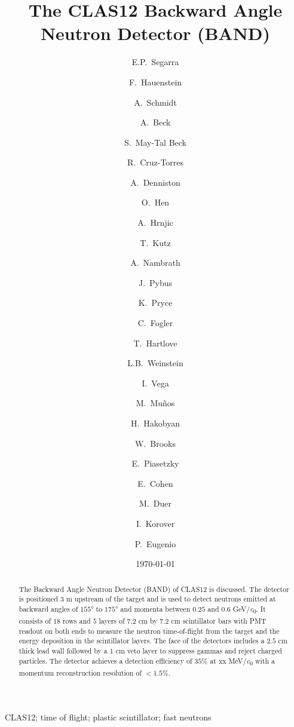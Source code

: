 \documentclass[3p,final,twocolumn]{elsarticle}
\newcommand*{\MIT }{Massachusetts Institute of Technology, Cambridge, Massachusetts 02139, USA}
\newcommand*{\ODU}{Old Dominion University, Norfolk, Virginia 23529, USA}
\newcommand*{\TAU }{School of Physics and Astronomy, Tel Aviv University, Tel Aviv 69978, Israel}
\newcommand*{\NRC}{Nuclear Research Center Negev, Be'er Sheva 84190, Israel}
\newcommand*{\FSU}{Florida State University, Tallahassee, Florida 32306, USA}
\newcommand*{\UTFSM}{Universidad T\'{e}cnica Federico Santa Mar\'{i}a, Casilla 110-V Valpara\'{i}so, Chile}
\begin{document}
\begin{frontmatter}

\title{The CLAS12 Backward Angle Neutron Detector (BAND) }



\author{E.P.~Segarra}
\author{F.~Hauenstein}

\author{A.~Schmidt}
\author{A.~Beck}
\author{S.~May-Tal Beck}
\author{R.~Cruz-Torres}
\author{A.~Denniston}
\author{O.~Hen}
\author{A.~Hrnjic}
\author{T.~Kutz}
\author{A.~Nambrath}
\author{J.~Pybus }
\address{\MIT}

\author{K.~Pryce}
\author{C.~Fogler}
\author{T.~Hartlove}
\author{L.B.~Weinstein}
\address{\ODU}
\author{I.~Vega}
\author{M.~Mu\~nos}
\author{H.~Hakobyan}
\author{W.~Brooks}
\address{\UTFSM}
\author{E.~Piasetzky}
\author{E.~Cohen}
\author{M.~Duer}
\address{\TAU}
\author{I.~Korover}
\address{\NRC}
\author{P.~Eugenio}
\address{\FSU}

\date{\today}

\begin{abstract}
The Backward Angle Neutron Detector (BAND) of CLAS12 is discussed. The detector is positioned $3$ \si{\meter} upstream of the target and is used to 
detect neutrons emitted at backward angles of $155$\si{\degree} to $175$\si{\degree} and momenta between $0.25$ and $0.6$ \si{\GeV/\clight}. It consists of $18$ rows and $5$ layers of $7.2$ \si{\centi\meter} 
by $7.2$ \si{\centi\meter} scintillator bars with PMT readout on both ends to measure the neutron time-of-flight from the target and the 
energy deposition in the scintillator layers. The face of the detectors includes a $2.5$ \si{\centi\meter} thick lead wall followed by a $1$ \si{\centi\meter} veto layer to suppress gammas and reject charged particles. The detector achieves a  detection efficiency of 
$35$\% at xx \si{\MeV/\clight} with a momentum reconstruction resolution of $<1.5$\%.
\end{abstract}

\begin{keyword}
CLAS12; time of flight; plastic scintillator; fast neutrons
\end{keyword}
\end{frontmatter}
\end{document}
